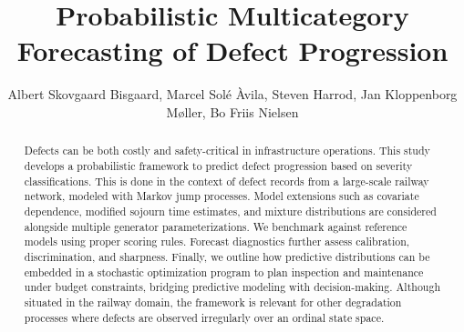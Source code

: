 \documentclass{article}
\title{Probabilistic Multicategory Forecasting of Defect Progression}
\author{Albert Skovgaard Bisgaard, Marcel Solé Àvila, Steven Harrod, Jan Kloppenborg Møller, Bo Friis Nielsen}
\date{}
\begin{document}
\maketitle


\begin{abstract}
Defects can be both costly and safety-critical in infrastructure operations. 
This study develops a probabilistic framework to predict defect progression based on severity classifications.
This is done in the context of defect records from a large-scale railway network, modeled with Markov jump processes.
Model extensions such as covariate dependence, modified sojourn time estimates, and mixture distributions are considered alongside multiple generator parameterizations.
We benchmark against reference models using proper scoring rules. Forecast diagnostics further assess calibration, discrimination, and sharpness. 
Finally, we outline how predictive distributions can be embedded in a stochastic optimization program to plan inspection and maintenance under budget constraints, bridging predictive modeling with decision-making.
Although situated in the railway domain, the framework is relevant for other degradation processes where defects are observed irregularly over an ordinal state space.
\end{abstract}


%
\end{document}
